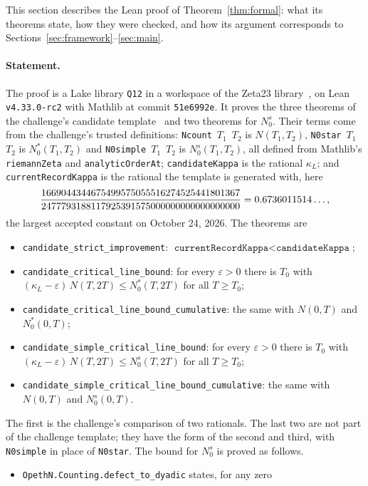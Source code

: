 \documentclass[11pt]{article}
\theoremstyle{definition}
\newcommand{\eps}{\varepsilon}
\begin{document}
\begin{sloppypar}
This section describes the Lean proof of Theorem~\ref{thm:formal}: what its
theorems state, how they were checked, and how its argument corresponds to
Sections~\ref{sec:framework}--\ref{sec:main}.

\paragraph{Statement.}
The proof is a Lake library \texttt{Q12} in a workspace of the Zeta23
library~\cite{Zeta23Lean}, on Lean \texttt{v4.33.0-rc2} with Mathlib at commit
\texttt{51e6992e}. It proves the three theorems of the challenge's candidate
template~\cite{RZF26} and two theorems for $N_0^s$. Their terms come from the
challenge's trusted definitions: \texttt{Ncount}~$T_1$~$T_2$ is $N(T_1,T_2)$,
\texttt{N0star}~$T_1$~$T_2$ is $N_0^*(T_1,T_2)$ and
\texttt{N0simple}~$T_1$~$T_2$ is $N_0^s(T_1,T_2)$, all defined from Mathlib's
\texttt{riemannZeta} and \texttt{analyticOrderAt};
\texttt{candidateKappa} is the rational $\kappa_L$; and
\texttt{currentRecordKappa} is the rational the template is generated with,
here
\[
  \frac{1669044344675499575055516274525441801367}{2477793188117925391575000000000000000000}=0.6736011514\ldots,
\]
the largest accepted constant on October 24, 2026. The theorems are
\begin{itemize}
\item \texttt{candidate\_strict\_improvement}:
$\texttt{currentRecordKappa}<\texttt{candidateKappa}$;
\item \texttt{candidate\_critical\_line\_bound}: for every $\eps>0$ there is
$T_0$ with $(\kappa_L-\eps)\,N(T,2T)\le N_0^*(T,2T)$ for all $T\ge T_0$;
\item \texttt{candidate\_critical\_line\_bound\_cumulative}: the same with
$N(0,T)$ and $N_0^*(0,T)$;
\item \texttt{candidate\_simple\_critical\_line\_bound}: for every $\eps>0$
there is $T_0$ with $(\kappa_L-\eps)\,N(T,2T)\le N_0^s(T,2T)$ for all $T\ge
T_0$;
\item \texttt{candidate\_simple\_critical\_line\_bound\_cumulative}: the same
with $N(0,T)$ and $N_0^s(0,T)$.
\end{itemize}
The first is the challenge's comparison of two rationals. The last two are
not part of the challenge template; they have the form of the second and
third, with \texttt{N0simple} in place of \texttt{N0star}. The bound for
$N_0^s$ is proved as follows.
\begin{itemize}
\item \texttt{OpethN.\allowbreak Counting.\allowbreak defect\_to\_dyadic} states, for any zero

\end{itemize}
\end{sloppypar}
\end{document}
